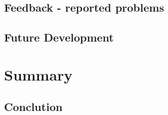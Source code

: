 \documentclass[BSP,english,oneside]{classes/gucthesis}
\begin{document}
	\section{Feedback - reported problems}
		\label{sec:feedback}
		

	\section{Future Development}
		\label{sec:future_development}
		


\chapter{Summary}
	\label{chap:summary}

	\section{Conclution}
		\label{sec:conclution}
		
		
\printnoidxglossary[sort=word]







\label{STOP_SUMMARY_PAGECOUNT}

\clearpage
\appendix %
\addappheadtotoc
\appendixpage


\clearpage
{}
\addtocounter{chapter}{1}


\clearpage
{}
\addtocounter{chapter}{1}

\end{document}
